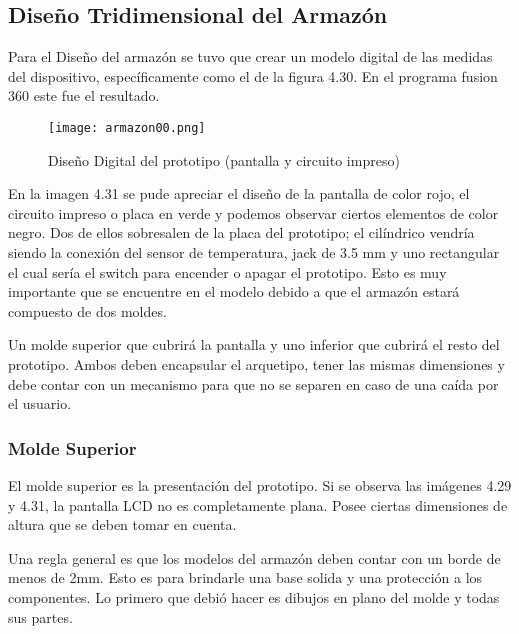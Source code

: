 \subsection{Diseño Tridimensional del Armazón}

\par
Para el Diseño del armazón se tuvo que crear un modelo digital de las medidas del dispositivo, específicamente como el de la figura 4.30. En el programa fusion 360 este fue el resultado.

\begin{figure}[H]
	\centering
	\texttt{[image: armazon00.png]}
	\caption{Diseño Digital del prototipo (pantalla y circuito impreso)}
\end{figure}

\par \noindent
En la imagen 4.31 se pude apreciar el diseño de la pantalla de color rojo, el circuito impreso o placa en verde y podemos observar ciertos elementos de color negro. Dos de ellos sobresalen de la placa del prototipo; el cilíndrico vendría siendo la conexión del sensor de temperatura, jack de 3.5 mm y uno rectangular el cual sería el switch para encender o apagar el prototipo. Esto es muy importante que se encuentre en el modelo debido a que el armazón estará compuesto de dos moldes.  

\par \noindent
Un molde superior que cubrirá la pantalla y uno inferior que cubrirá el resto del prototipo. Ambos deben encapsular el arquetipo, tener las mismas dimensiones y debe contar con un mecanismo para que no se separen en caso de una caída por el usuario.

\subsubsection{Molde Superior}

\par 
El molde superior es la presentación del prototipo. Si se observa las imágenes 4.29 y 4.31, la pantalla LCD no es completamente plana. Posee ciertas dimensiones de altura que se deben tomar en cuenta. 

\par \noindent
Una regla general es que los modelos del armazón deben contar con un borde de menos de 2mm. Esto es para brindarle una base solida y una protección a los componentes. Lo primero que debió hacer es dibujos en plano del molde y todas sus partes.

